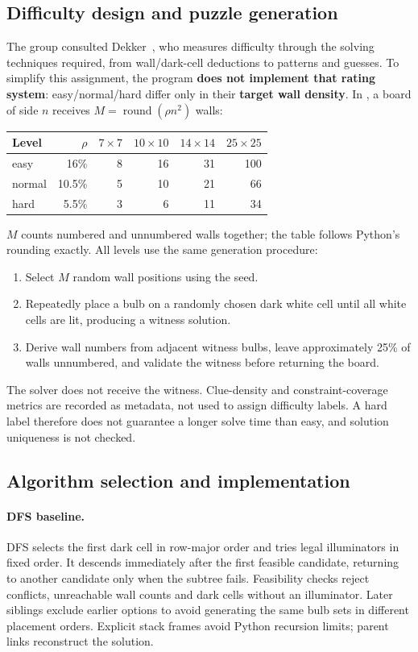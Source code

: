 \subsection{Difficulty design and puzzle generation}
The group consulted Dekker~\cite{akari-difficulty}, who measures difficulty
through the solving techniques required, from wall/dark-cell deductions to
patterns and guesses. To simplify this assignment, the program \textbf{does not
implement that rating system}: easy/normal/hard differ only in their
\textbf{target wall density}. In ,
a board of side $n$ receives $M=\operatorname{round}(\rho n^2)$ walls:
\begin{center}\small
\begin{tabular}{@{}lrrrrr@{}}\toprule
Level & $\rho$ & $7\times7$ & $10\times10$ & $14\times14$ & $25\times25$\\\midrule
easy   & 16\%   & 8 & 16 & 31 & 100\\
normal & 10.5\% & 5 & 10 & 21 & 66\\
hard   & 5.5\%  & 3 & 6 & 11 & 34\\
\bottomrule\end{tabular}
\end{center}
$M$ counts numbered and unnumbered walls together; the table follows Python's
rounding exactly. All levels use the same generation procedure:
\begin{enumerate}
\item Select $M$ random wall positions using the seed.
\item Repeatedly place a bulb on a randomly chosen dark white cell until all
white cells are lit, producing a witness solution.
\item Derive wall numbers from adjacent witness bulbs, leave approximately
25\% of walls unnumbered, and validate the witness before returning the board.
\end{enumerate}
The solver does not receive the witness. Clue-density and constraint-coverage
metrics are recorded as metadata, not used to assign difficulty labels. A hard
label therefore does not guarantee a longer solve time than easy, and solution
uniqueness is not checked.

\subsection{Algorithm selection and implementation}
\paragraph{DFS baseline.}
DFS selects the first dark cell in row-major order and tries legal illuminators
in fixed order. It descends immediately after the first feasible candidate,
returning to another candidate only when the subtree fails. Feasibility checks
reject conflicts, unreachable wall counts and dark cells without an illuminator.
Later siblings exclude earlier options to avoid generating the same bulb sets
in different placement orders. Explicit stack frames avoid Python recursion
limits; parent links reconstruct the solution.

